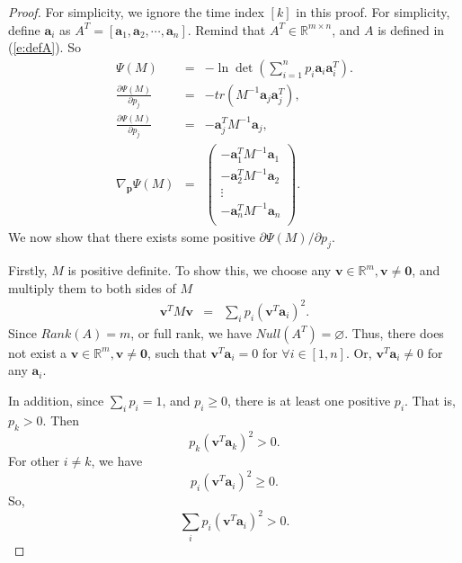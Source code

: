 \begin{proof}
For simplicity, we ignore the time index $[k]$ in this proof. For simplicity, define $\mathbf{a}_i$ as $A^T=[\mathbf{a}_1, \mathbf{a}_2, \cdots, \mathbf{a}_n]$. Remind that $A^T\in \mathbb{R}^{m\times n}$, and $A$ is defined in (\ref{e:defA}). So
\begin{eqnarray*}
\Psi(M) &=& -\ln\det(\sum_{i=1}^{n}p_i \mathbf{a}_i \mathbf{a}_i^T). \\
\frac{\partial \Psi(M)}{\partial p_j} &=& - tr(M^{-1} \mathbf{a}_j \mathbf{a}_j^T),\\
\frac{\partial \Psi(M)}{\partial p_j} &=& - \mathbf{a}_j^T M^{-1} \mathbf{a}_j, \\
\nabla_{\mathbf{p}}\Psi(M) &=& \left(
                                 \begin{array}{c}
                                   - \mathbf{a}_1^T M^{-1} \mathbf{a}_1 \\
                                   - \mathbf{a}_2^T M^{-1} \mathbf{a}_2  \\
                                   \vdots \\
                                   - \mathbf{a}_n^T M^{-1} \mathbf{a}_n  \\
                                 \end{array}
                               \right).
\end{eqnarray*}
We now show that there exists some positive $\partial\Psi(M)/\partial p_j$.


Firstly, $M$ is positive definite.
    To show this, we choose any $\mathbf{v}\in \mathbb{R}^m, \mathbf{v}\neq \mathbf{0}$, and multiply them to both sides of $M$
\begin{eqnarray*}
  \mathbf{v}^T M \mathbf{v} &=& \sum_i p_i (\mathbf{v}^T \mathbf{a}_i)^2.
\end{eqnarray*}
Since $Rank(A)=m$, or full rank, we have $Null(A^T)=\varnothing$. Thus, there does not exist a $\mathbf{v}\in \mathbb{R}^m, \mathbf{v}\neq \mathbf{0}$, such that $\mathbf{v}^T \mathbf{a}_i=0$ for $\forall i\in [1, n]$. Or, $\mathbf{v}^T \mathbf{a}_i\neq 0$ for any $\mathbf{a}_i$.

In addition, since $\sum_i p_i=1$, and $p_i \geq 0$, there is at least one positive $p_i$. That is, $p_k > 0$. Then
$$p_k (\mathbf{v}^T \mathbf{a}_k)^2 > 0.$$
    For other $i\neq k$, we have
    $$p_i (\mathbf{v}^T \mathbf{a}_i)^2 \geq 0.$$
     So, $$\sum_i p_i (\mathbf{v}^T \mathbf{a}_i)^2>0.$$


\end{proof}
